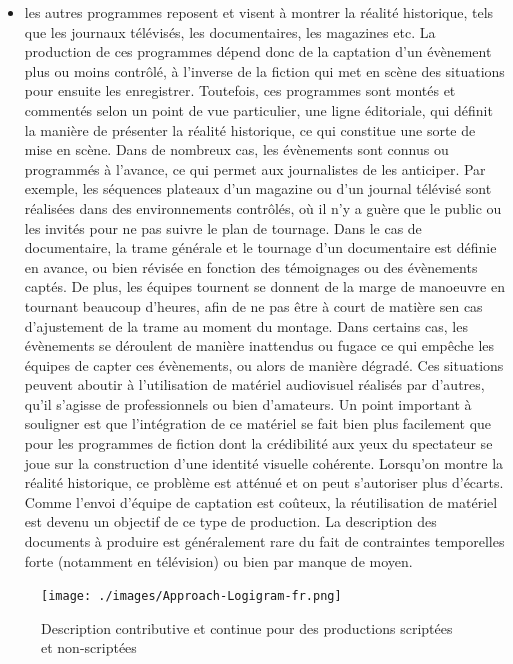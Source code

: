 \begin{itemize}
	\item les autres programmes reposent et visent à montrer la réalité historique, tels que les journaux télévisés, les documentaires, les magazines etc.
	La production de ces programmes dépend donc de la captation d'un évènement plus ou moins contrôlé, à l'inverse de la fiction qui met en scène des situations pour ensuite les enregistrer.
	Toutefois, ces programmes sont montés et commentés selon un point de vue particulier, une ligne éditoriale, qui définit la manière de présenter la réalité historique, ce qui constitue une sorte de mise en scène.
	Dans de nombreux cas, les évènements sont connus ou programmés à l'avance, ce qui permet aux journalistes de les anticiper. 
	Par exemple, les séquences plateaux d'un magazine ou d'un journal télévisé sont réalisées dans des environnements contrôlés, où il n'y a guère que le public ou les invités pour ne pas suivre le plan de tournage.
	Dans le cas de documentaire, la trame générale et le tournage d'un documentaire est définie en avance, ou bien révisée en fonction des témoignages ou des évènements captés. 
	De plus, les équipes tournent se donnent de la marge de manoeuvre en tournant beaucoup d'heures, afin de ne pas être à court de matière sen cas d'ajustement de la trame au moment du montage.
	Dans certains cas, les évènements se déroulent de manière inattendus ou fugace ce qui empêche les équipes de capter ces évènements, ou alors de manière dégradé.
	Ces situations peuvent aboutir à l'utilisation de matériel audiovisuel réalisés par d'autres, qu'il s'agisse de professionnels ou bien d'amateurs.
	Un point important à souligner est que l'intégration de ce matériel se fait bien plus facilement que pour les programmes de fiction dont la crédibilité aux yeux du spectateur se joue sur la construction d'une identité visuelle cohérente. 
	Lorsqu'on montre la réalité historique, ce problème est atténué et on peut s'autoriser plus d'écarts.
	Comme l'envoi d'équipe de captation est coûteux, la réutilisation de matériel est devenu un objectif de ce type de production. 
	La description des documents à produire est généralement rare du fait de contraintes temporelles forte (notamment en télévision) ou bien par manque de moyen.
\end{itemize}


\begin{figure}[ht!]
\centering
\texttt{[image: ./images/Approach-Logigram-fr.png]}
\caption{Description contributive et continue pour des productions scriptées et non-scriptées}
\label{img:strat-annot}
\end{figure}

